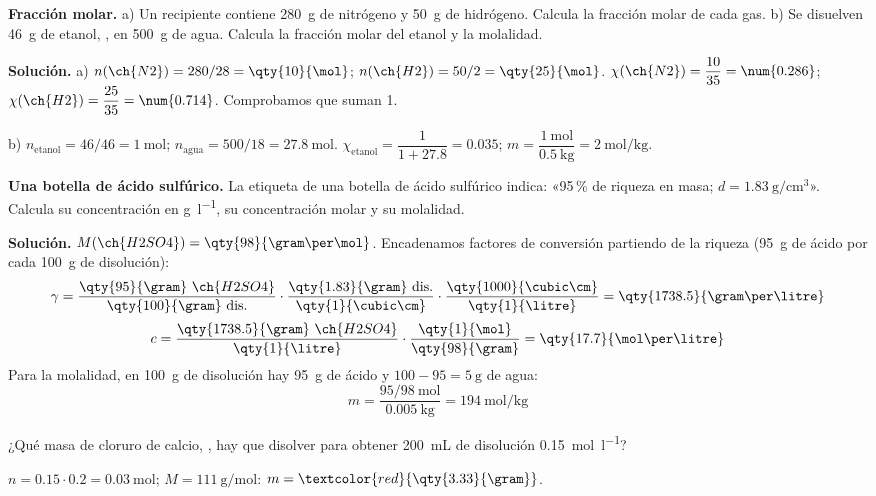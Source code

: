 \begin{example}
    \textbf{Fracción molar.} a) Un recipiente contiene \qty{280}{\gram} de nitrógeno y \qty{50}{\gram} de hidrógeno. Calcula la
    fracción molar de cada gas. b) Se disuelven \qty{46}{\gram} de etanol, , en \qty{500}{\gram} de agua. Calcula la
    fracción molar del etanol y la molalidad.

    \textbf{Solución.} a) \(n(\ch{N2}) = 280/28 = \qty{10}{\mol}\); \(n(\ch{H2}) = 50/2 = \qty{25}{\mol}\).
    \(\chi(\ch{N2}) = \dfrac{10}{35} = \num{0.286}\); \(\chi(\ch{H2}) = \dfrac{25}{35} = \num{0.714}\). Comprobamos que suman 1.

    b) \(n_{\text{etanol}} = 46/46 = \qty{1}{\mol}\); \(n_{\text{agua}} = 500/18 = \qty{27.8}{\mol}\).
    \(\chi_{\text{etanol}} = \dfrac{1}{1 + \num{27.8}} = \num{0.035}\); \(m = \dfrac{\qty{1}{\mol}}{\qty{0.5}{\kilo\gram}} = \qty{2}{\mol\per\kilo\gram}\).
\end{example}

\begin{example}
    \label{ex:ud2-sulfurico}
    \textbf{Una botella de ácido sulfúrico.} La etiqueta de una botella de ácido sulfúrico indica: «95\,\% de riqueza en masa;
    \(d = \qty{1.83}{\gram\per\cubic\cm}\)». Calcula su concentración en \unit{\gram\per\litre}, su concentración molar y su
    molalidad.

    \textbf{Solución.} \(M(\ch{H2SO4}) = \qty{98}{\gram\per\mol}\). Encadenamos factores de conversión partiendo de la riqueza
    (\qty{95}{\gram} de ácido por cada \qty{100}{\gram} de disolución):
    \[ \gamma = \frac{\qty{95}{\gram}\ \ch{H2SO4}}{\qty{100}{\gram}\ \text{dis.}} \cdot \frac{\qty{1.83}{\gram}\ \text{dis.}}{\qty{1}{\cubic\cm}} \cdot
    \frac{\qty{1000}{\cubic\cm}}{\qty{1}{\litre}} = \qty{1738.5}{\gram\per\litre} \]
    \[ c = \frac{\qty{1738.5}{\gram}\ \ch{H2SO4}}{\qty{1}{\litre}} \cdot \frac{\qty{1}{\mol}}{\qty{98}{\gram}} = \qty{17.7}{\mol\per\litre} \]
    Para la molalidad, en \qty{100}{\gram} de disolución hay \qty{95}{\gram} de ácido y \(100 - 95 = \qty{5}{\gram}\) de agua:
    \[ m = \frac{95/98\ \unit{\mol}}{\qty{0.005}{\kilo\gram}} = \qty{194}{\mol\per\kilo\gram} \]
\end{example}

\begin{exercise}
    ¿Qué masa de cloruro de calcio, , hay que disolver para obtener \qty{200}{\mL} de disolución
    \qty{0.15}{\mol\per\litre}?
    \begin{solu}
        \(n = \num{0.15} \cdot \num{0.2} = \qty{0.03}{\mol}\); \(M = \qty{111}{\gram\per\mol}\): \(m = \textcolor{red}{\qty{3.33}{\gram}}\).
    \end{solu}
\end{exercise}

